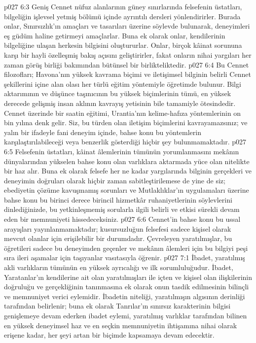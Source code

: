 \vs p027 6:3 Geniş Cennet nüfuz alanlarının güney sınırlarında felsefenin üstatları, bilgeliğin işlevsel yetmiş bölümü içinde ayrıntılı dersleri yönlendirirler. Burada onlar, Sınırsızlık’ın amaçları ve tasarıları üzerine söylevde bulunarak, deneyimleri eş güdüm haline getirmeyi amaçlarlar. Buna ek olarak onlar, kendilerinin bilgeliğine ulaşan herkesin bilgisini oluştururlar. Onlar, birçok kâinat sorununa karşı bir hayli özelleşmiş bakış açısını geliştirirler, fakat onların nihai yargıları her zaman görüş birliği bakımından bütünsel bir birlikteliktedir.
\vs p027 6:4 Bu Cennet filozofları; Havona’nın yüksek kavrama biçimi ve iletişimsel bilginin belirli Cennet şekillerini içine alan olası her türlü eğitim yöntemiyle öğretimde bulunur. Bilgi aktarımının ve düşünce taşınıcının bu yüksek biçimlerinin tümü, en yüksek derecede gelişmiş insan aklının kavrayış yetisinin bile tamamiyle ötesindedir. Cennet üzerinde bir saatin eğitimi, Urantia’nın kelime\hyp{}hafıza yöntemlerinin on bin yılına denk gelir. Siz, bu türden olan iletişim biçimlerini kavrayamazsınız; ve yalın bir ifadeyle fani deneyim içinde, bahse konu bu yöntemlerin karşılaştırılabileceği veya benzerlik gösterdiği hiçbir şey bulunmamaktadır.
\vs p027 6:5 Felsefenin üstatları, kâinat âlemlerinin tümünün yorumlanmasını mekânın dünyalarından yükselen bahse konu olan varlıklara aktarmada yüce olan nitelikte bir haz alır. Buna ek olarak felsefe her ne kadar yargılarında bilginin gerçekleri ve deneyimin doğruları olarak hiçbir zaman sabitleştirilemese de yine de siz; ebediyetin çözüme kavuşmamış sorunları ve Mutlaklıklar’ın uygulamaları üzerine bahse konu bu birinci derece birincil hizmetkâr ruhaniyetlerinin söylevlerini dinlediğinizde, bu yetkinleşmemiş sorularla ilgili belirli ve etkisi sürekli devam eden bir memnuniyeti hissedeceksiniz.
\vs p027 6:6 Cennet’in bahse konu bu ussal arayışları yayınlanmamaktadır; kusursuzluğun felsefesi sadece kişisel olarak mevcut olanlar için erişilebilir bir durumdadır. Çevreleyen yaratılmışlar, bu öğretileri sadece bu deneyimden geçenler ve mekânın âlemleri için bu bilgiyi peşi sıra ileri aşamalar için taşıyanlar vasıtasıyla öğrenir.
\vs p027 7:1 İbadet, yaratılmış akli varlıkların tümünün en yüksek ayrıcalığı ve ilk sorumluluğudur. İbadet, Yaratanlar’ın kendilerine ait olan yaratılmışları ile içten ve kişisel olan ilişkilerinin doğruluğu ve gerçekliğinin tanınmasına ek olarak onun tasdik edilmesinin bilinçli ve memnuniyet verici eylemidir. İbadetin niteliği, yaratılmışın algısının derinliği tarafından belirlenir; buna ek olarak Tanrılar’ın sınırsız karakterinin bilgisi genişlemeye devam ederken ibadet eylemi, yaratılmış varlıklar tarafından bilinen en yüksek deneyimsel haz ve en seçkin memnuniyetin ihtişamına nihai olarak erişene kadar, her şeyi artan bir biçimde kapsamaya devam edecektir.
